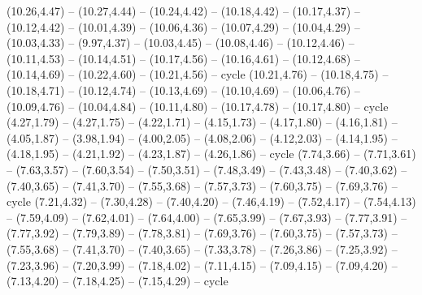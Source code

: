\expandafter\def\csname geo:gebiet:JPN\endcsname{
  (10.26,4.47) -- (10.27,4.44) -- (10.24,4.42) -- (10.18,4.42) -- (10.17,4.37) -- (10.12,4.42) -- (10.01,4.39) -- (10.06,4.36) -- (10.07,4.29) -- (10.04,4.29) -- (10.03,4.33) -- (9.97,4.37) -- (10.03,4.45) -- (10.08,4.46) -- (10.12,4.46) -- (10.11,4.53) -- (10.14,4.51) -- (10.17,4.56) -- (10.16,4.61) -- (10.12,4.68) -- (10.14,4.69) -- (10.22,4.60) -- (10.21,4.56) -- cycle
  (10.21,4.76) -- (10.18,4.75) -- (10.18,4.71) -- (10.12,4.74) -- (10.13,4.69) -- (10.10,4.69) -- (10.06,4.76) -- (10.09,4.76) -- (10.04,4.84) -- (10.11,4.80) -- (10.17,4.78) -- (10.17,4.80) -- cycle}
\expandafter\def\csname geo:gebiet:PRY\endcsname{
  (4.27,1.79) -- (4.27,1.75) -- (4.22,1.71) -- (4.15,1.73) -- (4.17,1.80) -- (4.16,1.81) -- (4.05,1.87) -- (3.98,1.94) -- (4.00,2.05) -- (4.08,2.06) -- (4.12,2.03) -- (4.14,1.95) -- (4.18,1.95) -- (4.21,1.92) -- (4.23,1.87) -- (4.26,1.86) -- cycle}
\expandafter\def\csname geo:gebiet:YEM\endcsname{
  (7.74,3.66) -- (7.71,3.61) -- (7.63,3.57) -- (7.60,3.54) -- (7.50,3.51) -- (7.48,3.49) -- (7.43,3.48) -- (7.40,3.62) -- (7.40,3.65) -- (7.41,3.70) -- (7.55,3.68) -- (7.57,3.73) -- (7.60,3.75) -- (7.69,3.76) -- cycle}
\expandafter\def\csname geo:gebiet:SAU\endcsname{
  (7.21,4.32) -- (7.30,4.28) -- (7.40,4.20) -- (7.46,4.19) -- (7.52,4.17) -- (7.54,4.13) -- (7.59,4.09) -- (7.62,4.01) -- (7.64,4.00) -- (7.65,3.99) -- (7.67,3.93) -- (7.77,3.91) -- (7.77,3.92) -- (7.79,3.89) -- (7.78,3.81) -- (7.69,3.76) -- (7.60,3.75) -- (7.57,3.73) -- (7.55,3.68) -- (7.41,3.70) -- (7.40,3.65) -- (7.33,3.78) -- (7.26,3.86) -- (7.25,3.92) -- (7.23,3.96) -- (7.20,3.99) -- (7.18,4.02) -- (7.11,4.15) -- (7.09,4.15) -- (7.09,4.20) -- (7.13,4.20) -- (7.18,4.25) -- (7.15,4.29) -- cycle}
